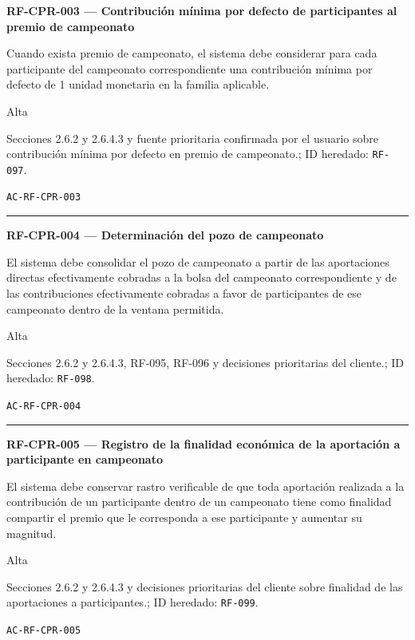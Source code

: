 \documentclass[10pt,letterpaper]{article}
\begin{document}
\noindent\textbf{RF-CPR-003 --- Contribución mínima por defecto de participantes al premio de campeonato}\par
\begin{description}[style=nextline,leftmargin=3.15cm,labelwidth=2.8cm,font=\normalfont\bfseries]
\item[Obligación] Cuando exista premio de campeonato, el sistema debe considerar para cada participante del campeonato correspondiente una contribución mínima por defecto de 1 unidad monetaria en la familia aplicable.
\item[Prioridad] Alta
\item[Procedencia] Secciones 2.6.2 y 2.6.4.3 y fuente prioritaria confirmada por el usuario sobre contribución mínima por defecto en premio de campeonato.; ID heredado: \texttt{RF-097}.
\item[Verificación] \texttt{AC-RF-CPR-003}
\end{description}
\vspace{0.25em}\hrule\vspace{0.65em}
\noindent\textbf{RF-CPR-004 --- Determinación del pozo de campeonato}\par
\begin{description}[style=nextline,leftmargin=3.15cm,labelwidth=2.8cm,font=\normalfont\bfseries]
\item[Obligación] El sistema debe consolidar el pozo de campeonato a partir de las aportaciones directas efectivamente cobradas a la bolsa del campeonato correspondiente y de las contribuciones efectivamente cobradas a favor de participantes de ese campeonato dentro de la ventana permitida.
\item[Prioridad] Alta
\item[Procedencia] Secciones 2.6.2 y 2.6.4.3, RF-095, RF-096 y decisiones prioritarias del cliente.; ID heredado: \texttt{RF-098}.
\item[Verificación] \texttt{AC-RF-CPR-004}
\end{description}
\vspace{0.25em}\hrule\vspace{0.65em}
\noindent\textbf{RF-CPR-005 --- Registro de la finalidad económica de la aportación a participante en campeonato}\par
\begin{description}[style=nextline,leftmargin=3.15cm,labelwidth=2.8cm,font=\normalfont\bfseries]
\item[Obligación] El sistema debe conservar rastro verificable de que toda aportación realizada a la contribución de un participante dentro de un campeonato tiene como finalidad compartir el premio que le corresponda a ese participante y aumentar su magnitud.
\item[Prioridad] Alta
\item[Procedencia] Secciones 2.6.2 y 2.6.4.3 y decisiones prioritarias del cliente sobre finalidad de las aportaciones a participantes.; ID heredado: \texttt{RF-099}.
\item[Verificación] \texttt{AC-RF-CPR-005}
\end{description}
\end{document}
